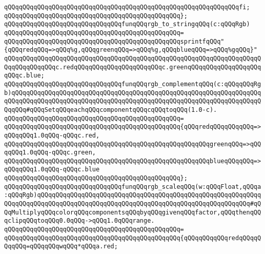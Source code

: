 \verb|qQQqqQQqqQQqqQQqqQQqqQQqqQQqqQQqqQQqqQQqqQQqqQQqqQQqqQQqqQQqqQQqfi;|\newline
\verb|qQQqqQQqqQQqqQQqqQQqqQQqqQQqqQQqqQQqqQQqqQQqqQQq};|\newline
\newline
\verb|qQQqqQQqqQQqqQQqqQQqqQQqqQQqqQQqfunqQQqrgb_to_stringqQQq(c:qQQqRgb)|\newline
\verb|qQQqqQQqqQQqqQQqqQQqqQQqqQQqqQQqqQQqqQQqqQQqqQQq=|\newline
\verb|qQQqqQQqqQQqqQQqqQQqqQQqqQQqqQQqqQQqqQQqqQQqqQQqsprintfqQQq"{qQQqredqQQq=>qQQq%g,qQQqgreenqQQq=>qQQq%g,qQQqblueqQQq=>qQQq%gqQQq}"|\newline
\verb|qQQqqQQqqQQqqQQqqQQqqQQqqQQqqQQqqQQqqQQqqQQqqQQqqQQqqQQqqQQqqQQqqQQqqQQqqQQqqQQqqQQqc.redqQQqqQQqqQQqqQQqqQQqqQQqc.greenqQQqqQQqqQQqqQQqqQQqqQQqc.blue;|\newline
\newline
\verb|qQQqqQQqqQQqqQQqqQQqqQQqqQQqqQQqfunqQQqrgb_complementqQQq(c:qQQqqQQqRgb)qQQqqQQqqQQqqQQqqQQqqQQqqQQqqQQqqQQqqQQqqQQqqQQqqQQqqQQqqQQqqQQqqQQqqQQqqQQqqQQqqQQqqQQqqQQqqQQqqQQqqQQqqQQqqQQqqQQqqQQqqQQqqQQqqQQqqQQqqQQqqQQq#qQQqSetqQQqeachqQQqcomponentqQQqcqQQqtoqQQq(1.0-c).|\newline
\verb|qQQqqQQqqQQqqQQqqQQqqQQqqQQqqQQqqQQqqQQqqQQqqQQq=|\newline
\verb|qQQqqQQqqQQqqQQqqQQqqQQqqQQqqQQqqQQqqQQqqQQqqQQq{qQQqredqQQqqQQqqQQq=>qQQqqQQq1.0qQQq-qQQqc.red,|\newline
\verb|qQQqqQQqqQQqqQQqqQQqqQQqqQQqqQQqqQQqqQQqqQQqqQQqqQQqqQQqgreenqQQq=>qQQqqQQq1.0qQQq-qQQqc.green,|\newline
\verb|qQQqqQQqqQQqqQQqqQQqqQQqqQQqqQQqqQQqqQQqqQQqqQQqqQQqqQQqblueqQQqqQQq=>qQQqqQQq1.0qQQq-qQQqc.blue|\newline
\verb|qQQqqQQqqQQqqQQqqQQqqQQqqQQqqQQqqQQqqQQqqQQqqQQq};|\newline
\newline
\verb|qQQqqQQqqQQqqQQqqQQqqQQqqQQqqQQqfunqQQqrgb_scaleqQQq(w:qQQqFloat,qQQqa:qQQqRgb)qQQqqQQqqQQqqQQqqQQqqQQqqQQqqQQqqQQqqQQqqQQqqQQqqQQqqQQqqQQqqQQqqQQqqQQqqQQqqQQqqQQqqQQqqQQqqQQqqQQqqQQqqQQqqQQqqQQqqQQqqQQqqQQq#qQQqMultiplyqQQqcolorqQQqcomponentsqQQqbyqQQqgivenqQQqfactor,qQQqthenqQQqclipqQQqtoqQQq0.0qQQq->qQQq1.0qQQqrange.|\newline
\verb|qQQqqQQqqQQqqQQqqQQqqQQqqQQqqQQqqQQqqQQqqQQqqQQq=|\newline
\verb|qQQqqQQqqQQqqQQqqQQqqQQqqQQqqQQqqQQqqQQqqQQqqQQq{qQQqqQQqqQQqredqQQqqQQqqQQq=qQQqqQQqwqQQq*qQQqa.red;|\newline
